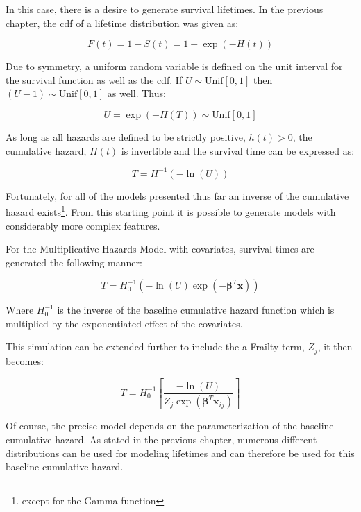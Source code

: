 In this case, there is a desire to generate survival lifetimes. In the previous chapter, the cdf of a lifetime distribution was given as:

$$ F(t) = 1 - S(t) = 1 - \exp(-H(t)) $$

Due to symmetry, a uniform random variable is defined on the unit interval for the survival function as well as the cdf. If $U \sim \text{Unif}[0,1]$ then $(U-1) \sim \text{Unif}[0,1]$ as well. Thus:

$$ U = \exp(-H(T)) \sim \text{Unif}[0,1] $$

As long as all hazards are defined to be strictly positive, $h(t) > 0$, the cumulative hazard, $H(t)$ is invertible and the survival time can be expressed as:

$$ T = H^{-1}(-\ln(U)) $$

Fortunately, for all of the models presented thus far an inverse of the cumulative hazard exists\footnote{except for the Gamma function}. From this starting point it is possible to generate models with considerably more complex features.

For the Multiplicative Hazards Model with covariates, survival times are generated the following manner\cite{Bender2005}:

$$ T = H_0^{-1}(-\ln(U) \exp(-\boldsymbol\beta^T \textbf{x})) $$

Where $H_0^{-1}$ is the inverse of the baseline cumulative hazard function which is multiplied by the exponentiated effect of the covariates. 

This simulation can be extended further to include the a Frailty term, $Z_j$, it then becomes\cite{Romdhane2015}:

$$ T = H_0^{-1}\left [\frac{-\ln(U)}{Z_{j} \exp(\boldsymbol\beta^T \textbf{x}_{ij})}  \right ] $$




Of course, the precise model depends on the parameterization of the baseline cumulative hazard. As stated in the previous chapter, numerous different distributions can be used for modeling lifetimes and can therefore be used for this baseline cumulative hazard. 

